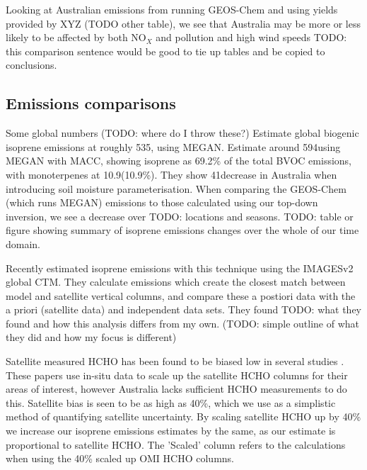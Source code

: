       Looking at Australian emissions from running GEOS-Chem and using yields provided by XYZ (TODO other table), we see that Australia may be more or less likely to be affected by both NO$_X$ and pollution and high wind speeds TODO: this comparison sentence would be good to tie up tables and be copied to conclusions.
      
      
  \subsection{Emissions comparisons}
    \label{BioIsop:Results:Emissions}
  
    Some global numbers (TODO: where do I throw these?)
    \textcite{Guenther2012} Estimate global biogenic isoprene emissions at roughly 535\tgpyr, using MEGAN.
    \textcite{Sindelarova2014} Estimate around 594\tgpyr using MEGAN with MACC, showing isoprene as 69.2\% of the total BVOC emissions, with monoterpenes at 10.9\tgpyr (10.9\%).
    They show 41\tgpyr decrease in Australia when introducing soil moisture parameterisation.
    When comparing the GEOS-Chem (which runs MEGAN) emissions to those calculated using our top-down inversion, we see a decrease over TODO: locations and seasons.
    TODO: table or figure showing summary of isoprene emissions changes over the whole of our time domain.
    
    Recently \textcite{Bauwens2016} estimated isoprene emissions with this technique using the IMAGESv2 global CTM.
    They calculate emissions which create the closest match between model and satellite vertical columns, and compare these a postiori data with the a priori (satellite data) and independent data sets.
    They found TODO: what they found and how this analysis differs from my own.
    (TODO: simple outline of what they did and how my focus is different)
    
    Satellite measured HCHO has been found to be biased low in several studies \parencite[eg.][]{Zhu2016,DeSmedt2015,Barkley2013}.
    These papers use in-situ data to scale up the satellite HCHO columns for their areas of interest, however Australia lacks sufficient HCHO measurements to do this.
    Satellite bias is seen to be as high as 40\%, which we use as a simplistic method of quantifying satellite uncertainty.
    By scaling satellite HCHO up by 40\% we increase our isoprene emissions estimates by the same, as our estimate is proportional to satellite HCHO.
    The 'Scaled' column refers to the calculations when using the 40\% scaled up OMI HCHO columns. %
    
